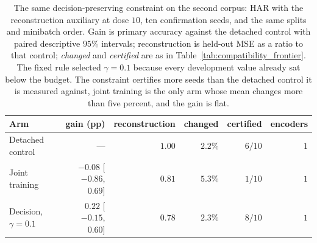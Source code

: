 \begin{table}[t]
\centering
\caption{The same decision-preserving constraint on the second corpus: HAR with the reconstruction auxiliary at dose $10$, ten confirmation seeds, and the same splits and minibatch order. Gain is primary accuracy against the detached control with paired descriptive $95\%$ intervals; reconstruction is held-out MSE as a ratio to that control; \emph{changed} and \emph{certified} are as in Table~\ref{tab:compatibility_frontier}. The fixed rule selected $\gamma=0.1$ because every development value already sat below the budget. The constraint certifies more seeds than the detached control it is measured against, joint training is the only arm whose mean changes more than five percent, and the gain is flat.}
\label{tab:decision_har}
\footnotesize
\setlength{\tabcolsep}{3pt}
\begin{tabular}{lrrrrr}
\toprule
Arm & gain (pp) & reconstruction & changed & certified & encoders \\
\midrule
Detached control & --- & $1.00$ & $2.2\%$ & $6/10$ & $1$ \\
Joint training & $-0.08$ [$-0.86$, $0.69$] & $0.81$ & $5.3\%$ & $1/10$ & $1$ \\
Decision, $\gamma=0.1$ & $0.22$ [$-0.15$, $0.60$] & $0.78$ & $2.3\%$ & $8/10$ & $1$ \\
\bottomrule
\end{tabular}
\end{table}
